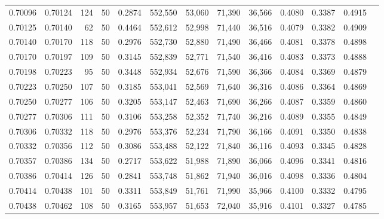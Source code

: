 \begin{tabular}{rrrrrrrrrrrrr}
0.70096 & 0.70124 &   124 &  50 &                                     0.2874 & 552,550 &  53,060 &  71,390 &  36,566 & 0.4080 & 0.3387 & 0.4915 \\
0.70125 & 0.70140 &    62 &  50 &                                     0.4464 & 552,612 &  52,998 &  71,440 &  36,516 & 0.4079 & 0.3382 & 0.4909 \\
0.70140 & 0.70170 &   118 &  50 &                                     0.2976 & 552,730 &  52,880 &  71,490 &  36,466 & 0.4081 & 0.3378 & 0.4898 \\
0.70170 & 0.70197 &   109 &  50 &                                     0.3145 & 552,839 &  52,771 &  71,540 &  36,416 & 0.4083 & 0.3373 & 0.4888 \\
0.70198 & 0.70223 &    95 &  50 &                                     0.3448 & 552,934 &  52,676 &  71,590 &  36,366 & 0.4084 & 0.3369 & 0.4879 \\
0.70223 & 0.70250 &   107 &  50 &                                     0.3185 & 553,041 &  52,569 &  71,640 &  36,316 & 0.4086 & 0.3364 & 0.4869 \\
0.70250 & 0.70277 &   106 &  50 &                                     0.3205 & 553,147 &  52,463 &  71,690 &  36,266 & 0.4087 & 0.3359 & 0.4860 \\
0.70277 & 0.70306 &   111 &  50 &                                     0.3106 & 553,258 &  52,352 &  71,740 &  36,216 & 0.4089 & 0.3355 & 0.4849 \\
0.70306 & 0.70332 &   118 &  50 &                                     0.2976 & 553,376 &  52,234 &  71,790 &  36,166 & 0.4091 & 0.3350 & 0.4838 \\
0.70332 & 0.70356 &   112 &  50 &                                     0.3086 & 553,488 &  52,122 &  71,840 &  36,116 & 0.4093 & 0.3345 & 0.4828 \\
0.70357 & 0.70386 &   134 &  50 &                                     0.2717 & 553,622 &  51,988 &  71,890 &  36,066 & 0.4096 & 0.3341 & 0.4816 \\
0.70386 & 0.70414 &   126 &  50 &                                     0.2841 & 553,748 &  51,862 &  71,940 &  36,016 & 0.4098 & 0.3336 & 0.4804 \\
0.70414 & 0.70438 &   101 &  50 &                                     0.3311 & 553,849 &  51,761 &  71,990 &  35,966 & 0.4100 & 0.3332 & 0.4795 \\
0.70438 & 0.70462 &   108 &  50 &                                     0.3165 & 553,957 &  51,653 &  72,040 &  35,916 & 0.4101 & 0.3327 & 0.4785 \\

\end{tabular}
